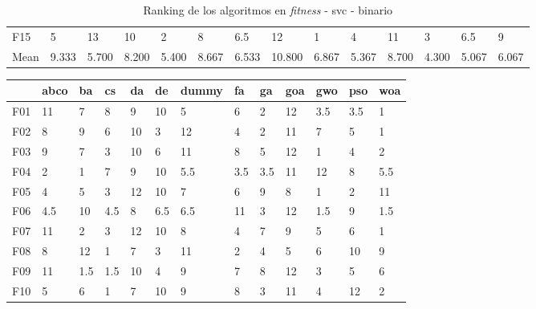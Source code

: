\begin{table}
\begin{adjustbox}{width=\linewidth}
\begin{tabular}{llllllllllllll}
            F15  & 5     & 13    & 10    & 2     & 8     & 6.5   & 12     & 1     & 4     & 11    & 3     & 6.5   & 9     \\
            Mean & 9.333 & 5.700 & 8.200 & 5.400 & 8.667 & 6.533 & 10.800 & 6.867 & 5.367 & 8.700 & 4.300 & 5.067 & 6.067 \\
            \bottomrule
        \end{tabular}
    \end{adjustbox}
    \caption{Ranking de los algoritmos en \textit{fitness} - svc - binario}
    \label{tab:ranking_fitness_bin_svc}
\end{table}

\begin{table}
    \begin{adjustbox}{width=\linewidth}
        \begin{tabular}{lllllllllllll}
            \toprule
            {}   & abco  & ba    & cs    & da    & de    & dummy & fa    & ga    & goa   & gwo   & pso   & woa   \\
            \midrule
            F01  & 11    & 7     & 8     & 9     & 10    & 5     & 6     & 2     & 12    & 3.5   & 3.5   & 1     \\
            F02  & 8     & 9     & 6     & 10    & 3     & 12    & 4     & 2     & 11    & 7     & 5     & 1     \\
            F03  & 9     & 7     & 3     & 10    & 6     & 11    & 8     & 5     & 12    & 1     & 4     & 2     \\
            F04  & 2     & 1     & 7     & 9     & 10    & 5.5   & 3.5   & 3.5   & 11    & 12    & 8     & 5.5   \\
            F05  & 4     & 5     & 3     & 12    & 10    & 7     & 6     & 9     & 8     & 1     & 2     & 11    \\
            F06  & 4.5   & 10    & 4.5   & 8     & 6.5   & 6.5   & 11    & 3     & 12    & 1.5   & 9     & 1.5   \\
            F07  & 11    & 2     & 3     & 12    & 10    & 8     & 4     & 7     & 9     & 5     & 6     & 1     \\
            F08  & 8     & 12    & 1     & 7     & 3     & 11    & 2     & 4     & 5     & 6     & 10    & 9     \\
            F09  & 11    & 1.5   & 1.5   & 10    & 4     & 9     & 7     & 8     & 12    & 3     & 5     & 6     \\
            F10  & 5     & 6     & 1     & 7     & 10    & 9     & 8     & 3     & 11    & 4     & 12    & 2     \\

\end{tabular}
\end{adjustbox}
\end{table}
